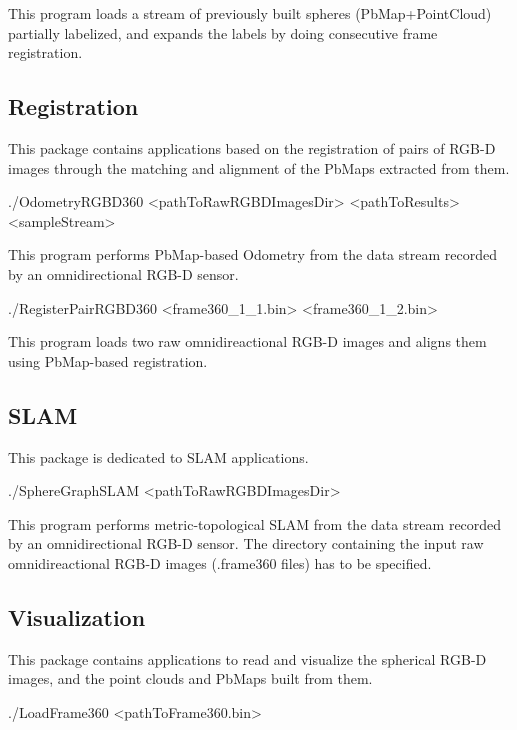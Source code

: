 This program loads a stream of previously built spheres (Pb\-Map+\-Point\-Cloud) partially labelized, and expands the labels by doing consecutive frame registration.\hypertarget{index_Registration}{}\subsection{Registration}\label{index_Registration}
This package contains applications based on the registration of pairs of R\-G\-B-\/\-D images through the matching and alignment of the Pb\-Maps extracted from them.

\begin{DoxyVerb}./OdometryRGBD360 <pathToRawRGBDImagesDir> <pathToResults> <sampleStream>
\end{DoxyVerb}


This program performs Pb\-Map-\/based Odometry from the data stream recorded by an omnidirectional R\-G\-B-\/\-D sensor.

\begin{DoxyVerb}./RegisterPairRGBD360 <frame360_1_1.bin> <frame360_1_2.bin>
\end{DoxyVerb}


This program loads two raw omnidireactional R\-G\-B-\/\-D images and aligns them using Pb\-Map-\/based registration.\hypertarget{index_SLAM}{}\subsection{S\-L\-A\-M}\label{index_SLAM}
This package is dedicated to S\-L\-A\-M applications.

\begin{DoxyVerb}./SphereGraphSLAM <pathToRawRGBDImagesDir>
\end{DoxyVerb}


This program performs metric-\/topological S\-L\-A\-M from the data stream recorded by an omnidirectional R\-G\-B-\/\-D sensor. The directory containing the input raw omnidireactional R\-G\-B-\/\-D images (.frame360 files) has to be specified.\hypertarget{index_Visualization}{}\subsection{Visualization}\label{index_Visualization}
This package contains applications to read and visualize the spherical R\-G\-B-\/\-D images, and the point clouds and Pb\-Maps built from them.

\begin{DoxyVerb}./LoadFrame360 <pathToFrame360.bin>
\end{DoxyVerb}


